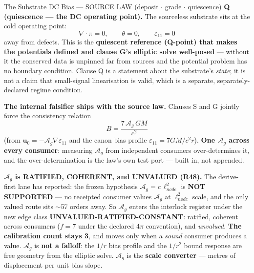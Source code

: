 \begin{resultbox}{The Substrate DC Bias — SOURCE LAW (deposit $\cdot$ grade $\cdot$ quiescence)}
\medskip\noindent\textbf{Q (quiescence --- the DC operating point).} The sourceless substrate sits at the cold operating point:
\begin{equation}
    \nabla\cdot\pi = 0,\qquad \theta = 0,\qquad \varepsilon_{11} = 0
    \label{eq:axiom5_quiescence}
\end{equation}
away from defects. This is the \textbf{quiescent reference (Q-point) that makes the potentials defined and clause G's elliptic solve well-posed} --- without it the conserved data is unpinned far from sources and the potential problem has no boundary condition. Clause Q is a statement about the substrate's \emph{state}; it is not a claim that small-signal linearisation is valid, which is a separate, separately-declared regime condition.

\medskip\noindent\textbf{The internal falsifier ships with the source law.} Clauses S and G jointly force the consistency relation
\begin{equation}
    B = \frac{7\,\mathcal{A}_g\,G M}{c^2}
    \label{eq:axiom5_falsifier}
\end{equation}
(from $\mathbf{u}_0 = -\mathcal{A}_g\nabla\varepsilon_{11}$ and the canon bias profile $\varepsilon_{11} = 7GM/c^2 r$). \textbf{One $\mathcal{A}_g$ across every consumer}: measuring $\mathcal{A}_g$ from independent consumers over-determines it, and the over-determination is the law's own test port --- built in, not appended.

\medskip\noindent\textbf{$\mathcal{A}_g$ is RATIFIED, COHERENT, and UNVALUED (R48).} The derive-first lane has reported: the frozen hypothesis $\mathcal{A}_g = c\,\ell_{node}^2$ is \textbf{NOT SUPPORTED} --- no receipted consumer values $\mathcal{A}_g$ at $\ell_{node}^2$ scale, and the only valued route sits $\sim$57 orders away. So $\mathcal{A}_g$ enters the interlock register under the new edge class \textbf{UNVALUED-RATIFIED-CONSTANT}: ratified, coherent across consumers ($f = 7$ under the declared $4\pi$ convention), and \emph{unvalued}. \textbf{The calibration count stays 3}, and moves only when a \emph{sound} consumer produces a value. $\mathcal{A}_g$ is \textbf{not a falloff}: the $1/r$ bias profile and the $1/r^2$ bound response are free geometry from the elliptic solve. $\mathcal{A}_g$ is the \textbf{scale converter} --- metres of displacement per unit bias slope.


\end{resultbox}
